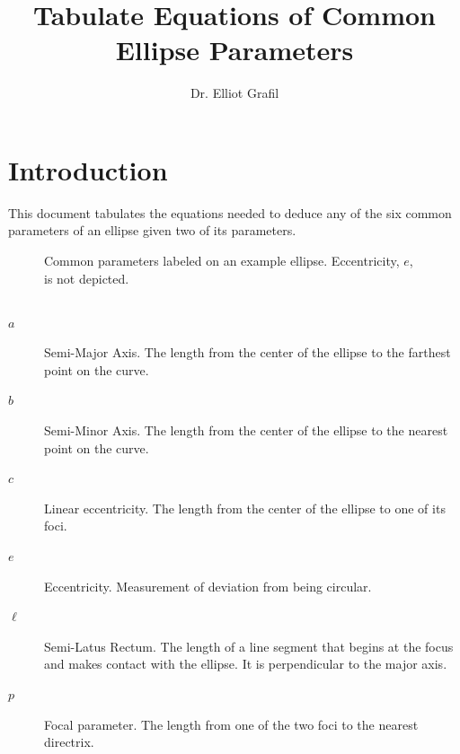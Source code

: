 \documentclass{article}
\title{\vspace{-2.5cm}Tabulate Equations of Common Ellipse Parameters}
\author{Dr. Elliot Grafil}
\begin{document}
\maketitle
\section*{Introduction}
This document tabulates the equations needed to deduce any of the six common parameters of an ellipse given two of its parameters. 
\begin{figure}[H]
\begin{center}
\noindent{}
  \caption{Common parameters labeled on an example ellipse. Eccentricity, $e$, is not depicted.}
  \label{fig:boat1}
  \end{center}
\end{figure}
\subsection*{}
\begin{description}
\item[$a$] Semi-Major Axis. The length from the center of the ellipse to the farthest point on the curve.
\item[$b$] Semi-Minor Axis. The length from the center of the ellipse to the nearest point on the curve.
\item[$c$] Linear eccentricity. The length from the center of the ellipse to one of its foci.
\item[$e$] Eccentricity. Measurement of deviation from being circular.
\item[$\ell$] Semi-Latus Rectum. The length of a line segment that begins at the focus and makes contact with the ellipse. It is perpendicular to the major axis.
\item[$p$] Focal parameter. The length from one of the two foci to the nearest directrix. 
\end{description}
\end{document}
